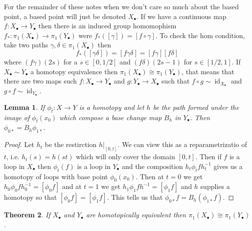 \documentclass[40pt]{article}
\newtheorem{theorem}{Theorem}[section]
\DeclareMathOperator{\id}{\text{id}}
\newtheorem{lemma}[theorem]{Lemma}
\begin{document}
		For the remainder of these notes when we don't care so much about the based point, a based point will just be denoted $X_\bullet$. If we have a continuous map $f: X_\bullet\rightarrow Y_\bullet$ then there is an induced group homomophism $f_*:\pi_1(X_\bullet) \rightarrow \pi_1(Y_\bullet)$ were $f_*([\gamma]) = [f \circ \gamma]$. To check the hom condition, take two paths $\gamma, \delta \in \pi_1(X_\bullet)$ then 
		\[
		f_*([\gamma\delta]) = [f\gamma\delta] = [f\gamma][f\delta]
		\]
		where $(f\gamma)(2s)$ for a $s \in [0,1/2]$ and $(f\delta)(2s-1)$ for $s \in [1/2,1]$. If $X_\bullet \sim Y_\bullet$ a homotopy equivalence then $\pi_1(X_\bullet) \cong \pi_1(Y_\bullet)$, that means that there are two maps such $f: X_\bullet\rightarrow Y_\bullet$ and $g:Y_\bullet\rightarrow X_\bullet$ such that $f \circ g \sim \id_{X_\bullet}$ and $g \circ f \sim \id_{Y_\bullet}$. 
		\begin{lemma}
			If $\phi_t: X\rightarrow Y$ is a homotopy and let $h$ be the path formed under the image of $\phi_t(x_0)$ which compose a base change map $B_h$ in $Y_\bullet$. Then 
			$\phi_{0*} = B_h\phi_{1*}$. 
		\end{lemma}
		\begin{proof}
			Let $h_t$ be the restirction $h|_{[0,t]}$. We can view this as a reparametrizatio of $t$, i.e. $h_t(s) = h(st)$ which will only cover the domain $[0,t]$. Then if $f$ is a loop in $X_\bullet$ then $\phi_t(f)$ is a loop in $Y_\bullet$ and the composition $h_t\phi_tfh_t^{-1}$ gives us a homotopy of loops with base point $\phi_0(x_0)$. Then at $t = 0$ we get $h_0\phi_{0}fh_0^{-1} = [\phi_0f]$ and at $t =1$ we get $h_1\phi_{1}fh^{-1} = [\phi_1f]$ and $h$ supplies a homotopy so that $[\phi_0f] = [\phi_1f]$. This tells us that $\phi_{0*}f = B_h(\phi_{1*}f)$.
		\end{proof}
		\begin{theorem}
			If $X_\bullet$ and $Y_\bullet$ are homotopically equivalent then $\pi_1(X_\bullet) \cong \pi_1(Y_\bullet)$. 
		\end{theorem}
		
	
\end{document}
